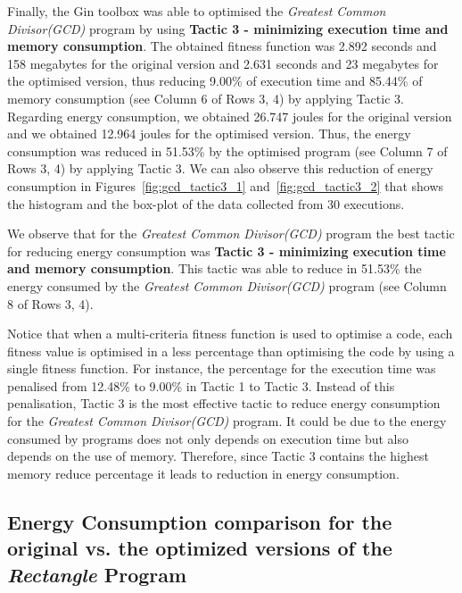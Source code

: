 \vspace{.5em}
Finally, the Gin toolbox was able to optimised the \textit{Greatest Common Divisor(GCD)} program by using \textbf{Tactic 3 - minimizing execution time and memory consumption}. The obtained fitness function was 2.892 seconds and 158  megabytes for the original version and 2.631 seconds and 23 megabytes for the optimised version, thus reducing 9.00\% of execution time and 85.44\% of memory consumption (see Column 6 of Rows 3, 4) by applying Tactic 3. Regarding energy consumption, we obtained 26.747 joules for the original version and we obtained 12.964 joules for the optimised version. Thus, the energy consumption was reduced in 51.53\% by the optimised program (see Column 7 of Rows 3, 4) by applying Tactic 3. We can also observe this reduction of energy consumption in Figures~\ref{fig:gcd_tactic3_1} and~\ref{fig:gcd_tactic3_2} that shows the histogram and the box-plot of the data collected from 30 executions.

\vspace{.5em}
We observe that for the \textit{Greatest Common Divisor(GCD)} program the best tactic for reducing energy consumption was \textbf{Tactic 3 - minimizing execution time and memory consumption}. This tactic was able to reduce in 51.53\% the energy consumed by the  \textit{Greatest Common Divisor(GCD)} program (see Column 8 of Rows 3, 4).

\vspace{.5em}
Notice that when a multi-criteria fitness function is used to optimise a code, each fitness value is optimised in a less percentage than optimising the code by using a single fitness function. For instance, the percentage for the execution time was penalised from 12.48\% to 9.00\% in Tactic 1 to Tactic 3. Instead of this penalisation, Tactic 3 is the most effective tactic to reduce energy consumption for the \textit{Greatest Common Divisor(GCD)} program. It could be due to the energy consumed by programs does not only depends on execution time but also depends on the use of memory. Therefore, since Tactic 3 contains the highest memory reduce percentage it leads to reduction in energy consumption.

\vspace{-5pt}
\subsection{Energy Consumption comparison for the original vs. the optimized versions of the \textit{Rectangle} Program}

